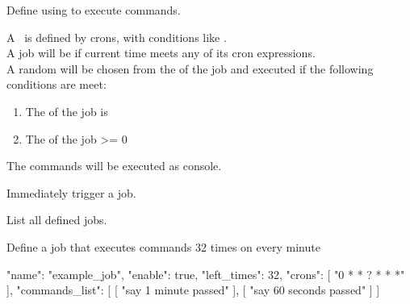 \label{ch:command_scheduler}

Define  using  to execute commands.

A~ is defined by crons, with conditions like .\\
A job will be  if current time meets any of its cron expressions.\\
A random  will be chosen from the  of the job and executed if the following conditions are meet:
\begin{enumerate}
    \item The  of the job is 
    \item The  of the job >= 0
\end{enumerate}
The commands will be executed as console.

Immediately trigger a job.

List all defined jobs.

\begin{example}{Define a job that executes commands 32 times on every minute}
    \begin{json}
    {
        "name": "example_job",
        "enable": true,
        "left_times": 32,
        "crons": [
        "0 * * ? * * *"
        ],
        "commands_list": [
        [
        "say 1 minute passed"
        ],
        [
        "say 60 seconds passed"
        ]
        ]
    }
    \end{json}
\end{example}
